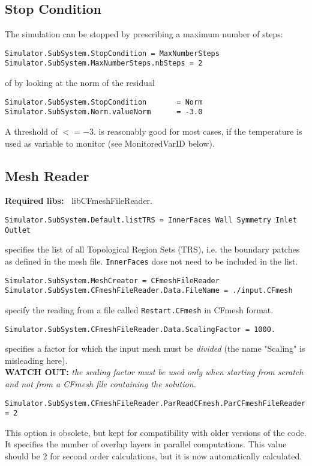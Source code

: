 \documentclass[11pt]{article}
\begin{document}
\subsection{Stop Condition}

The simulation can be stopped by prescribing a maximum number of steps:

\begin{verbatim}
Simulator.SubSystem.StopCondition = MaxNumberSteps
Simulator.SubSystem.MaxNumberSteps.nbSteps = 2
\end{verbatim}
of by looking at the norm of the residual

\begin{verbatim}
Simulator.SubSystem.StopCondition       = Norm
Simulator.SubSystem.Norm.valueNorm      = -3.0
\end{verbatim}
A threshold of $<= -3.$ is reasonably good for most cases, if the temperature is used as variable to monitor (see MonitoredVarID below).

\subsection{Mesh Reader}

{\bf Required libs:~} libCFmeshFileReader.

\begin{verbatim}
Simulator.SubSystem.Default.listTRS = InnerFaces Wall Symmetry Inlet Outlet
\end{verbatim}
specifies the list of all Topological Region Sets (TRS), i.e. the boundary patches as defined in the mesh file.
{\tt InnerFaces} dose not need to be included in the list.

\begin{verbatim}
Simulator.SubSystem.MeshCreator = CFmeshFileReader
Simulator.SubSystem.CFmeshFileReader.Data.FileName = ./input.CFmesh
\end{verbatim}
specify the reading from a file called {\tt Restart.CFmesh} in CFmesh format. 

\begin{verbatim}
Simulator.SubSystem.CFmeshFileReader.Data.ScalingFactor = 1000. 
\end{verbatim}
specifies a factor for which the input mesh must be {\it divided} (the name "Scaling" is misleading here). \\
{\bf WATCH OUT:} {\it the scaling factor must be used only when starting from scratch and not from a CFmesh file
  containing the solution.}
  
\begin{verbatim}
Simulator.SubSystem.CFmeshFileReader.ParReadCFmesh.ParCFmeshFileReader.NbOverlapLayers = 2
\end{verbatim}
This option is obsolete, but kept for compatibility with older versions of the code. It specifies the number 
of overlap layers in parallel computations. This value should be 2 for second order calculations, 
but it is now automatically calculated.
\end{document}
